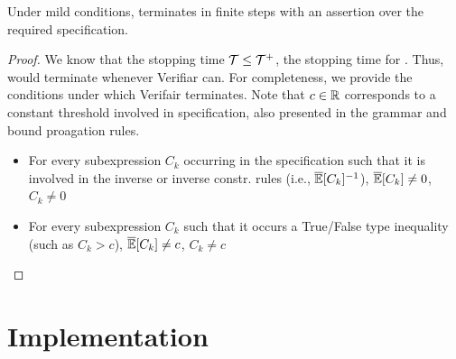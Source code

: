 \begin{corollary}
Under mild conditions, \AVOIRmethodname{} terminates in finite steps with an assertion over the required specification.
\label{corollary:termination}
\end{corollary}
\begin{proof}
We know that the stopping time ${\mathcal{T}} \leq {\mathcal{T}}^+$, the stopping time for \AVOIRmethodname{}.
Thus, \AVOIRmethodname{} would terminate whenever Verifiar can. 
For completeness, we provide the conditions under which Verifair terminates.
Note that $c \in \mathbb{R}$ corresponds to a constant threshold involved in specification, also presented in the grammar and bound proagation rules.
\begin{itemize}
    \item  For every subexpression $C_k$ occurring in the specification such that it is involved in the inverse or inverse constr. rules (i.e., $\overline{\mathbb{E}}[C_k]^{-1}$), $\overline{\mathbb{E}}[C_k] \neq 0$, $C_k \neq 0$
    \item For every subexpression $C_k$ such that it occurs a True/False type inequality (such as $C_k > c$), $\overline{\mathbb{E}}[C_k] \neq c$, $C_k \neq c$
\end{itemize}
\end{proof}

\section{Implementation}
\label{sec:implementation}

